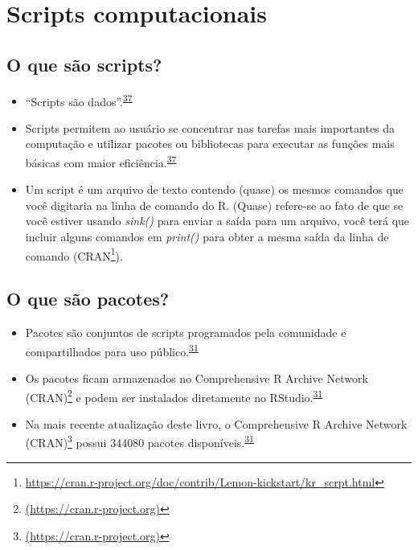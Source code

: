 \documentclass[
  a4paper,
]{book}
\renewcommand{\href}[2]{#2\footnote{\url{#1}}}
\begin{document}
\hypertarget{scripts-computacionais}{%
\section{Scripts computacionais}\label{scripts-computacionais}}

\hypertarget{o-que-suxe3o-scripts}{%
\subsection{O que são scripts?}\label{o-que-suxe3o-scripts}}

\begin{itemize}
\item
  ``Scripts são dados''.\textsuperscript{\protect\hyperlink{ref-hinsen2011}{37}}
\item
  Scripts permitem ao usuário se concentrar nas tarefas mais importantes da computação e utilizar pacotes ou bibliotecas para executar as funções mais básicas com maior eficiência.\textsuperscript{\protect\hyperlink{ref-hinsen2011}{37}}
\item
  Um script é um arquivo de texto contendo (quase) os mesmos comandos que você digitaria na linha de comando do R. (Quase) refere-se ao fato de que se você estiver usando \emph{sink()} para enviar a saída para um arquivo, você terá que incluir alguns comandos em \emph{print()} para obter a mesma saída da linha de comando (\href{https://cran.r-project.org/doc/contrib/Lemon-kickstart/kr_scrpt.html}{CRAN}).
\end{itemize}

\hypertarget{o-que-suxe3o-pacotes}{%
\subsection{O que são pacotes?}\label{o-que-suxe3o-pacotes}}

\begin{itemize}
\item
  Pacotes são conjuntos de scripts programados pela comunidade e compartilhados para uso público.\textsuperscript{\protect\hyperlink{ref-introduc2020}{31}}
\item
  Os pacotes ficam armazenados no \href{(https://cran.r-project.org)}{Comprehensive R Archive Network (CRAN)} e podem ser instalados diretamente no RStudio.\textsuperscript{\protect\hyperlink{ref-introduc2020}{31}}
\item
  Na mais recente atualização deste livro, o \href{(https://cran.r-project.org)}{Comprehensive R Archive Network (CRAN)} possui 344080 pacotes disponíveis.\textsuperscript{\protect\hyperlink{ref-introduc2020}{31}}
\end{itemize}
\end{document}
